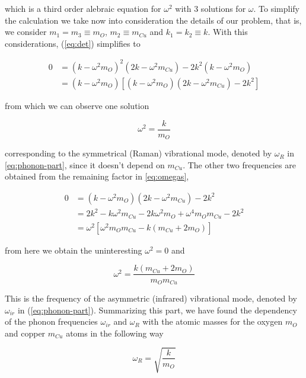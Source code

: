 \noindent which is a third order alebraic equation for $\omega^2$ with 3 solutions for $\omega$.
To simplify the calculation we take now into consideration the details of our problem, that is, we consider $m_1 = m_3 \equiv m_O$, $m_2 \equiv m_{Cu}$ and $k_1 = k_2 \equiv k$. 
With this considerations, (\ref{eq:det}) simplifies to

\begin{align}
  \label{eq:omegas}
  0 & = (k-\omega^2m_O)^2(2k-\omega^2m_{Cu})-2k^2(k-\omega^2m_O) \\
    & = (k-\omega^2m_O)[(k-\omega^2m_O)(2k-\omega^2m_{Cu})-2k^2]
\end{align}

\noindent from which we can observe one solution

\begin{equation}
  \omega^2= \frac{k}{m_O}
\end{equation}

\noindent corresponding to the symmetrical (Raman) vibrational mode, denoted by $\omega_{R}$ in \ref{eq:phonon-part}, since it doesn't depend on $m_{Cu}$.
The other two frequencies are obtained from the remaining factor in \ref{eq:omegas},

\begin{equation}
  \begin{split}
    0 & = (k-\omega^2m_O)(2k-\omega^2m_{Cu})-2k^2 \\
      & = 2k^2-k\omega^2m_{Cu}-2k\omega^2m_O+\omega^4m_Om_{Cu}-2k^2 \\
      & = \omega^2[\omega^2m_Om_{Cu}-k(m_{Cu}+2m_O)]
  \end{split}
\end{equation}

\noindent from here we obtain the uninteresting $\omega^2=0$ and

\begin{equation}
  \omega^2 = \frac{k(m_{Cu}+2m_O)}{m_Om_{Cu}}
\end{equation}

This is the frequency of the asymmetric (infrared) vibrational mode, denoted by $\omega_{ir}$ in (\ref{eq:phonon-part}).
Summarizing this part, we have found the dependency of the phonon frequencies $\omega_{ir}$ and $\omega_R$ with the atomic masses for the oxygen $m_O$ and copper $m_{Cu}$ atoms in the following way

\begin{equation}
  \label{eq:omegaR}
  \omega_{R}= \sqrt{\frac{k}{m_O}}
\end{equation}


